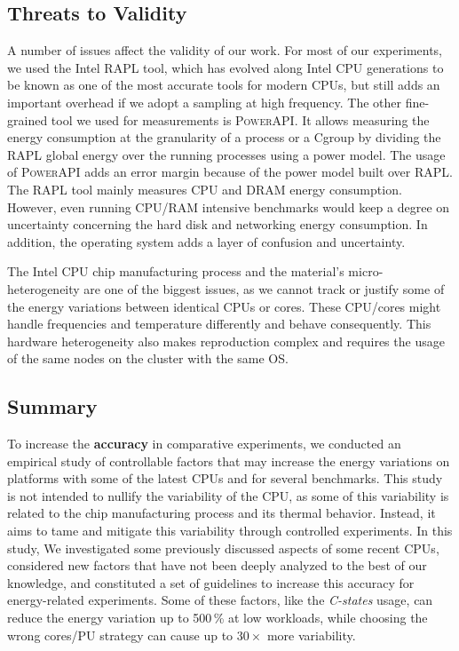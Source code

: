 \subsection{Threats to Validity}
A number of issues affect the validity of our work.
For most of our experiments, we used the Intel RAPL tool, which has evolved along Intel CPU generations to be known as one of the most accurate tools for modern CPUs, but still adds an important overhead if we adopt a sampling at high frequency.
The other fine-grained tool we used for measurements is \textsc{PowerAPI}.
It allows measuring the energy consumption at the granularity of a process or a Cgroup by dividing the RAPL global energy over the running processes using a power model.
The usage of \textsc{PowerAPI} adds an error margin because of the power model built over RAPL.
The RAPL tool mainly measures CPU and DRAM energy consumption.
However, even running CPU/RAM intensive benchmarks would keep a degree on uncertainty concerning the hard disk and networking energy consumption.
In addition, the operating system adds a layer of confusion and uncertainty.

The Intel CPU chip manufacturing process and the material's micro-heterogeneity are one of the biggest issues, as we cannot track or justify some of the energy variations between identical CPUs or cores.
These CPU/cores might handle frequencies and temperature differently and behave consequently.
This hardware heterogeneity also makes reproduction complex and requires the usage of the same nodes on the cluster with the same OS.


\subsection{Summary}
To increase the \textbf{accuracy} in comparative experiments, we conducted an empirical study of controllable factors that may increase the energy variations on platforms with some of the latest CPUs and for several benchmarks.
This study is not intended to nullify the variability of the CPU, as some of this variability is related to the chip manufacturing process and its thermal behavior. Instead, it aims to tame and mitigate this variability through controlled experiments.
In this study, We investigated some previously discussed aspects of some recent CPUs, considered new factors that have not been deeply analyzed to the best of our knowledge, and constituted a set of guidelines to increase this accuracy for energy-related experiments.
Some of these factors, like the \emph{C-states} usage, can reduce the energy variation up to 500\,\% at low workloads, while choosing the wrong cores/PU strategy can cause up to $30\times$ more variability.
